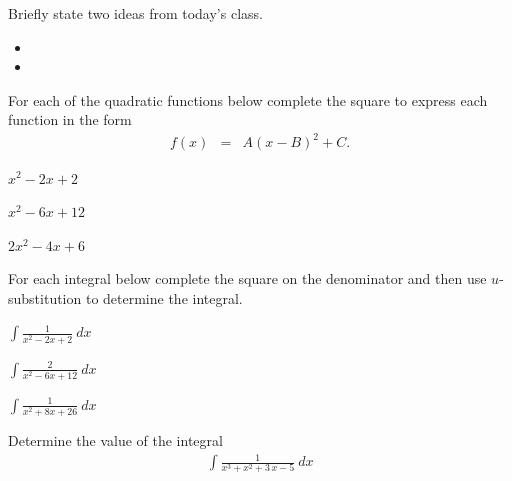 \postClass

\begin{problem}
\item Briefly state two ideas from today's class.
  \begin{itemize}
  \item 
  \item 
  \end{itemize}
\item 
  \begin{subproblem}
    \item
  \end{subproblem}
\end{problem}



\begin{problem}
\item For each of the quadratic functions below complete the square to
  express each function in the form
  \begin{eqnarray*}
    f(x) & = & A(x-B)^2 + C.
  \end{eqnarray*}
  \begin{subproblem}
  \item $x^2 - 2x + 2$
    \vfill
  \item $x^2 - 6x + 12$
    \vfill
  \item $2x^2 - 4x + 6$
    \vfill
  \end{subproblem}
\end{problem}

\begin{problem}
\item For each integral below complete the square on the denominator
  and then use $u$-substitution to determine the integral.
  \begin{subproblem}
    \item ${\displaystyle \int}\frac{1}{x^2 - 2x + 2}~dx$ \\
      \vfill
    \item ${\displaystyle\int}\frac{2}{x^2 - 6x + 12}~dx$ \\
      \vfill
    \item ${\displaystyle\int}\frac{1}{x^2 + 8x + 26}~dx$ \\
      \vfill
  \end{subproblem}

  \clearpage

\item Determine the value of the integral
  \begin{eqnarray*}
    \int \frac{1}{x^3+x^2+3\,x-5} ~ dx
  \end{eqnarray*}

  \vfill

\end{problem}


